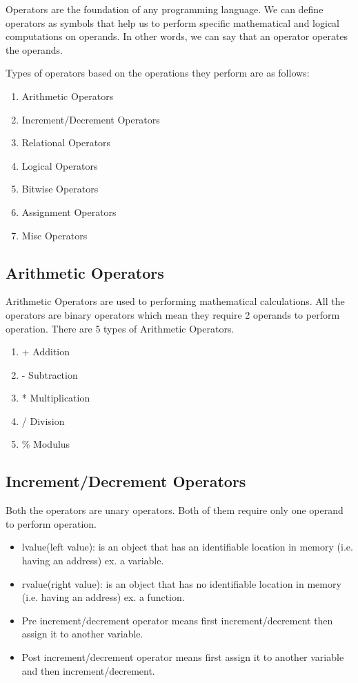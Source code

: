 Operators are the foundation of any programming language. We can define operators as symbols that help us to perform specific mathematical and logical computations on operands. In other words, we can say that an operator operates the operands. 

Types of operators based on the operations they perform are as follows:
\begin{enumerate}
    \item Arithmetic Operators
    \item Increment/Decrement Operators
    \item Relational Operators
    \item Logical Operators
    \item Bitwise Operators
    \item Assignment Operators
    \item Misc Operators
\end{enumerate}

\subsection{Arithmetic Operators}
Arithmetic Operators are used to performing mathematical calculations. All the operators are binary operators which mean they require 2 operands to perform operation. There are 5 types of Arithmetic Operators. 
\begin{enumerate}
    \item + Addition
    \item - Subtraction
    \item * Multiplication
    \item / Division
    \item \% Modulus
\end{enumerate}

\subsection{Increment/Decrement Operators}
Both the operators are unary operators. Both of them require only one operand to perform operation.

\begin{itemize}
    \item lvalue(left value): is an object that has an identifiable location in memory (i.e. having an address) ex. a variable.
    \item rvalue(right value): is an object that has no identifiable location in memory (i.e. having an address) ex. a function.
    \item Pre increment/decrement operator means first increment/decrement then assign it to another variable.
    \item Post increment/decrement operator means first assign it to another variable and then increment/decrement.
\end{itemize}
    
